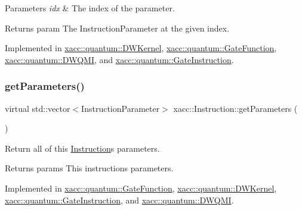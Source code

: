 \begin{DoxyParams}{Parameters}
{\em idx} & The index of the parameter. \\
\hline
\end{DoxyParams}
\begin{DoxyReturn}{Returns}
param The Instruction\+Parameter at the given index. 
\end{DoxyReturn}


Implemented in \hyperlink{a01221_a81711b7db284aba35d6952e4d1d15d41}{xacc\+::quantum\+::\+D\+W\+Kernel}, \hyperlink{a01249_a5991903323e412777bedc4f0c862eb63}{xacc\+::quantum\+::\+Gate\+Function}, \hyperlink{a01225_aa15882df55d3f0af3a2ec9d72a2db4c0}{xacc\+::quantum\+::\+D\+W\+Q\+MI}, and \hyperlink{a01253_addd6185279fe99fbdc3d4efd96e42162}{xacc\+::quantum\+::\+Gate\+Instruction}.

\mbox{\label{a01657_aeb67c67713896e8f27a5c7dd531f3340}} 
\subsubsection{\texorpdfstring{get\+Parameters()}{getParameters()}}
{\footnotesize\ttfamily virtual std\+::vector$<$Instruction\+Parameter$>$ xacc\+::\+Instruction\+::get\+Parameters (\begin{DoxyParamCaption}{ }\end{DoxyParamCaption})\hspace{0.3cm}{\ttfamily [pure virtual]}}

Return all of this \hyperlink{a01657}{Instruction}\textquotesingle{}s parameters.

\begin{DoxyReturn}{Returns}
params This instructions parameters. 
\end{DoxyReturn}


Implemented in \hyperlink{a01249_af7aabfe699a4dced576ff7fafff969d5}{xacc\+::quantum\+::\+Gate\+Function}, \hyperlink{a01221_a829462cff34e2257da06afd8a2051a8e}{xacc\+::quantum\+::\+D\+W\+Kernel}, \hyperlink{a01253_a8584444f9577283f6844ab32bdc4db72}{xacc\+::quantum\+::\+Gate\+Instruction}, and \hyperlink{a01225_a896d9a4e2876129c2cf81ef028daf1ff}{xacc\+::quantum\+::\+D\+W\+Q\+MI}.

\mbox{\label{a01657_a4383f1036d0fcfe890ab9c613dbd5f38}} 
